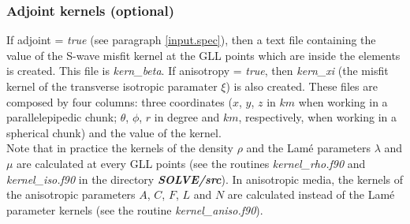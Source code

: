 \subsubsection{Adjoint kernels (optional)}
\label{adjkern}

If adjoint = \textit{true} (see paragraph \ref{input.spec}), then a text file containing the value of the
S-wave misfit kernel at the GLL points which are inside the elements is created. This file is
\textit{kern\_beta}. If anisotropy = \textit{true}, then \textit{kern\_xi} (the misfit kernel of the transverse
isotropic paramater $\xi$) is also created. These files  are composed by four columns: three coordinates ($x$,
$y$, $z$ in $km$ when working in a parallelepipedic chunk; $\theta$, $\phi$, $r$ in degree and $km$,
respectively, when working in a spherical chunk) and the value of the kernel.\\
Note that in practice the kernels of the density $\rho$ and the Lam\'e parameters $\lambda$ and $\mu$ are
calculated at every GLL points (see the routines \textit{kernel\_rho.f90} and \textit{kernel\_iso.f90} in the
directory \textit{\bfseries SOLVE/src}). In anisotropic media, the kernels of the anisotropic parameters $A$,
$C$, $F$, $L$ and $N$ are calculated instead of the Lam\'e parameter kernels (see the routine
\textit{kernel\_aniso.f90}).
